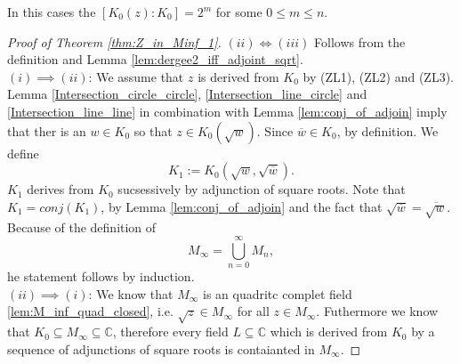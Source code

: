 \begin{remark}
    \label{rem:Z_in_Minf_1}
    In this cases the $[K_0(z):K_0] = 2^m$ for some $0 \le m \le n$.
\end{remark}
\begin{proof}[Proof of Theorem \ref{thm:Z_in_Minf_1}]
    $(ii) \iff (iii)$ Follows from the definition and Lemma \ref{lem:dergee2_iff_adjoint_sqrt}.\\
    $(i) \implies (ii)$: We assume that $z$ is derived from $K_0$ by (ZL1), (ZL2) and (ZL3). %
    Lemma \ref{Intersection_circle_circle}, \ref{Intersection_line_circle} and \ref{Intersection_line_line} in combination with Lemma \ref{lem:conj_of_adjoin} 
    imply that ther is an $w \in K_0$ so that $z \in K_0(\sqrt{w})$. Since $\overline{w} \in K_0$, by definition. We define
    $$K_1 := K_0(\sqrt{w},\sqrt{\overline{w}}).$$
    $K_1$ derives from $K_0$ sucsessively by adjunction of square roots. Note that $K_1 = conj(K_1)$, by Lemma \ref{lem:conj_of_adjoin} and the fact that $\sqrt{\overline{w}} = \overline{\sqrt{w}}$.
    Because of the definition of $$M_{\infty} = \bigcup_{n=0}^{\infty} M_n,$$
    he statement follows by induction.\\ %
    $(ii) \implies (i)$: We know that $M_{\infty}$ is an quadritc complet field \ref{lem:M_inf_quad_closed}, i.e. $\sqrt{z} \in M_{\infty}$ for all $z \in M_{\infty}$.
    Futhermore we know that $K_0\subseteq M_{\infty} \subseteq \mathbb{C}$, %
    therefore every field $L\subseteq \mathbb{C}$ which is derived from $K_0$ by a sequence of adjunctions of square roots is contaianted in $M_{\infty}$.
\end{proof}